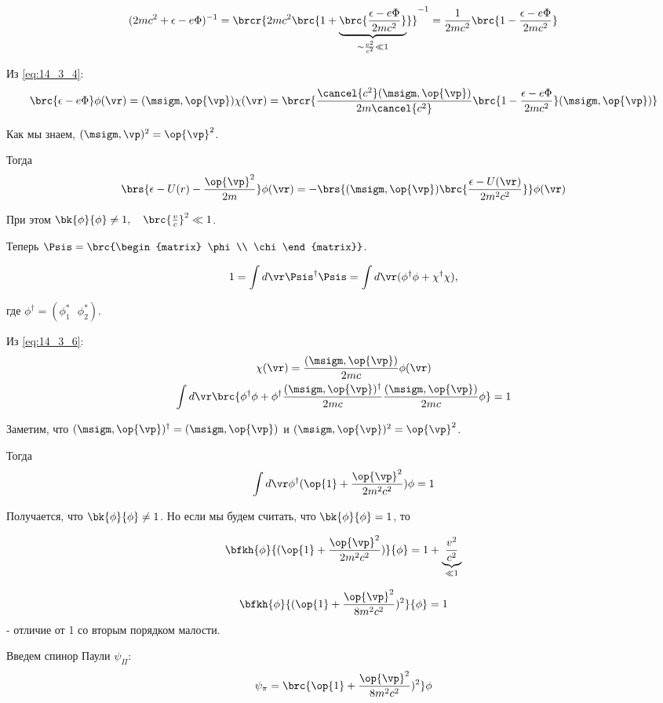 $$
(2mc^2 + \epsilon - e\Phi)^{-1} = \brcr{2mc^2 \brc{1 + \underbrace{\brc{\frac{\epsilon - e\Phi}{2mc^2}}}_{\sim \frac{v^2}{c^2} \ll 1}}}^{-1} = \frac{1}{2mc^2} \brc{1 - \frac{\epsilon - e\Phi}{2mc^2}}
$$

Из \eqref{eq:14_3_4}:
$$
\brc{\epsilon - e\Phi}\phi(\vr) = (\msigm, \op{\vp}) \chi(\vr) = \brcr{\frac{\cancel{c^2} (\msigm, \op{\vp})}{2m \cancel{c^2}}\brc{1 - \frac{\epsilon - e\Phi}{2mc^2}}(\msigm, \op{\vp})}
$$

Как мы знаем, $(\msigm, \vp)^2 = \op{\vp}^2$.

Тогда
\begin{equation}
\label{eq:14_4_2}
\brs{\epsilon - U(r) - \frac{\op{\vp}^2}{2m}}\phi(\vr) = - \brs{(\msigm, \op{\vp})\brc{\frac{\epsilon - U(\vr)}{2m^2c^2}}} \phi(\vr)
\end{equation}

При этом $\bk{\phi}{\phi} \not = 1, ~~~\brc{\frac{v}{c}}^2 \ll 1$.

Теперь $\Psis = \brc{\begin{matrix} \phi \\ \chi \end{matrix}}$.

$$
1 = \int d \vr \Psis^\dag \Psis = \int d\vr (\phi^\dag \phi + \chi^\dag \chi),
$$

где $\phi^\dag = (\phi_1^*~~~\phi_2^*)$.

Из \eqref{eq:14_3_6}:
\begin{gather*}
\chi(\vr) = \frac{(\msigm, \op{\vp})}{2mc}\phi(\vr) \\
\int d\vr \brc{\phi^\dag \phi + \phi^\dag \frac{(\msigm, \op{\vp})^\dag}{2mc} \frac{(\msigm, \op{\vp})}{2mc} \phi} = 1
\end{gather*}

Заметим, что $(\msigm, \op{\vp})^\dag = (\msigm, \op{\vp})$ и $(\msigm, \op{\vp})^2 = \op{\vp}^2$.

Тогда
$$
\int d\vr \phi^\dag (\op{1} + \frac{\op{\vp}^2}{2m^2c^2}) \phi = 1  
$$

Получается, что $\bk{\phi}{\phi} \not = 1$. Но если мы будем считать, что $\bk{\phi}{\phi}= 1$, то

$$
\bfkh{\phi}{(\op{1} + \frac{\op{\vp}^2}{2m^2c^2})}{\phi} = 1  + \underbrace{\frac{v^2}{c^2}}_{\ll 1}
$$

$$
\bfkh{\phi}{(\op{1} + \frac{\op{\vp}^2}{8m^2c^2})^2}{\phi} = 1
$$
- отличие от 1 со вторым порядком малости.

Введем спинор Паули $\psi_\Pi$:
$$
\psi_\pi = \brc{\op{1} + \frac{\op{\vp}^2}{8m^2c^2})^2} \phi
$$

